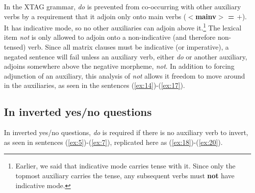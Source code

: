 \beginsentences
{}\label{ex:8} 
\label{ex:9} 
\label{ex:10} 
\label{ex:11} 
\label{ex:12} 
\label{ex:13} 
\endsentences

 
 
In the XTAG grammar, {\it do} is prevented from co-occurring with other 
auxiliary verbs by a requirement that it adjoin only onto main verbs 
({\bf $<$mainv$>$ = $+$}).  It has 
indicative mode, so no other auxiliaries can adjoin above it.\footnote{Earlier, we said that indicative mode carries tense with it.  Since only the topmost auxiliary carries the tense, any subsequent verbs must {\bf not} have indicative mode.}  The lexical item {\it not} is only allowed to adjoin onto a 
non-indicative (and therefore non-tensed) verb.  Since all matrix clauses must 
be indicative (or imperative), a negated sentence will fail unless an auxiliary 
verb, either {\it do} or another auxiliary, adjoins somewhere above the 
negative morpheme, {\it not}. In addition to forcing adjunction of an 
auxiliary, this analysis of {\it not} allows it freedom to move around in the 
auxiliaries, as seen in the sentences (\ref{ex:14})-(\ref{ex:17}). 
 
\beginsentences
{}\label{ex:14} 
\label{ex:15} 
\label{ex:16} 
\label{ex:17} 
\endsentences

 
\subsection{In inverted yes/no questions} 
 
In inverted yes/no questions, {\it do} is required if there is no auxiliary 
verb to invert, as seen in sentences (\ref{ex:5})-(\ref{ex:7}), replicated here 
as (\ref{ex:18})-(\ref{ex:20}). 
 
\beginsentences
{}\label{ex:18} 
\label{ex:19} 
\label{ex:20} 
\label{ex:21} 
\endsentences

